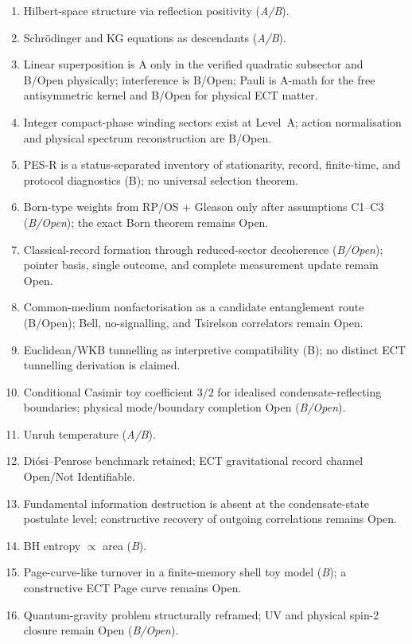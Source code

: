 \documentclass[11pt,a4paper]{article}
\begin{document}
\begin{enumerate}
\item Hilbert-space structure via reflection positivity (\emph{A/B}).
\item Schr\"odinger and KG equations as descendants (\emph{A/B}).
\item Linear superposition is A only in the verified quadratic subsector and B/Open physically; interference is B/Open; Pauli is A-math for the free antisymmetric kernel and B/Open for physical ECT matter.
\item Integer compact-phase winding sectors exist at Level~A; action normalisation and physical spectrum reconstruction are B/Open.
\item PES-R is a status-separated inventory of stationarity, record, finite-time, and protocol diagnostics (B); no universal selection theorem.
\item Born-type weights from RP/OS + Gleason only after assumptions C1--C3 (\emph{B/Open}); the exact Born theorem remains Open.
\item Classical-record formation through reduced-sector decoherence (\emph{B/Open}); pointer basis, single outcome, and complete measurement update remain Open.
\item Common-medium nonfactorisation as a candidate entanglement route (B/Open); Bell, no-signalling, and Tsirelson correlators remain Open.
\item Euclidean/WKB tunnelling as interpretive compatibility (B); no distinct ECT tunnelling derivation is claimed.
\item Conditional Casimir toy coefficient $3/2$ for idealised condensate-reflecting boundaries; physical mode/boundary completion Open (\emph{B/Open}).
\item Unruh temperature (\emph{A/B}).
\item Di\'osi--Penrose benchmark retained; ECT gravitational record channel Open/Not Identifiable.
\item Fundamental information destruction is absent at the condensate-state postulate level; constructive recovery of outgoing correlations remains Open.
\item BH entropy $\propto$ area (\emph{B}).
\item Page-curve-like turnover in a finite-memory shell toy model (\emph{B}); a constructive ECT Page curve remains Open.
\item Quantum-gravity problem structurally reframed; UV and physical spin-2 closure remain Open (\emph{B/Open}).
\end{enumerate}
\end{document}
